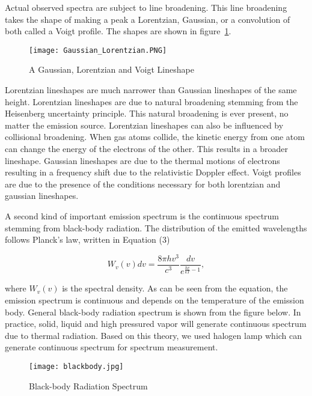 \documentclass{article}
\begin{document}
Actual observed spectra are subject to line broadening. This line broadening takes the shape of making a peak a Lorentzian, Gaussian, or a convolution of both called a Voigt profile. The shapes are shown in figure~\ref{fig:gaussian and lorentzian}.

\begin{figure} [h!]
    \centering
    \texttt{[image: Gaussian\_Lorentzian.PNG]}
    \caption{A Gaussian, Lorentzian and Voigt Lineshape}
    \label{fig:gaussian and lorentzian}
\end{figure}

Lorentzian lineshapes are much narrower than Gaussian lineshapes of the same height. Lorentzian lineshapes are due to natural broadening stemming from the Heisenberg uncertainty principle. This natural broadening is ever present, no matter the emission source. Lorentzian lineshapes can also be influenced by collisional broadening. When gas atoms collide, the kinetic energy from one atom can change the energy of the electrons of the other. This results in a broader lineshape. Gaussian lineshapes are due to the thermal motions of electrons resulting in a frequency shift due to the relativistic Doppler effect. Voigt profiles are due to the presence of the conditions necessary for both lorentzian and gaussian lineshapes.

A second kind of important emission spectrum is the continuous spectrum stemming from black-body radiation. The distribution of the emitted wavelengths follows Planck's law, written in Equation (3)

\begin{equation}
    W_v (v) dv = \frac{8\pi h v^3}{c^3} \frac{dv}{ e^{\frac{hv}{kT} -1 }},
\end{equation}

where $W_v(v)$ is the spectral density. As can be seen from the equation, the emission spectrum is continuous and depends on the temperature of the emission body.
General black-body radiation spectrum is shown from the figure below.\cite{black_body} In practice, solid, liquid and high pressured vapor will generate continuous spectrum due to thermal radiation. Based on this theory, we used halogen lamp which can generate continuous spectrum for spectrum measurement.  

\begin{figure}[h!]
    \centering
    \texttt{[image: blackbody.jpg]}
    \caption{Black-body Radiation Spectrum}
    \label{fig:black_body}
\end{figure}
\end{document}
